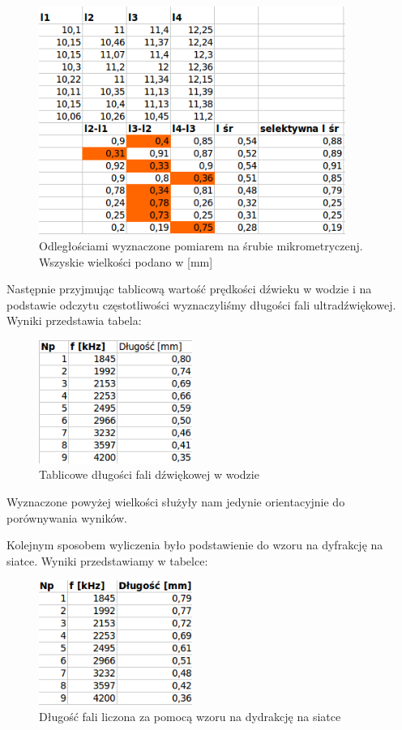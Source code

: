 \documentclass[a4paper,12pt]{article}
\begin{document}
\begin{figure} [H]
  \begin{center}
    \includegraphics[width = 10cm]{tab2.png}
    \caption{Odległościami wyznaczone pomiarem na śrubie mikrometryczenj. Wszyskie wielkości podano w [mm]}
  \end{center}
\end{figure}


Następnie przyjmując tablicową wartość prędkości dźwieku w wodzie i na podstawie odczytu częstotliwości wyznaczyliśmy długości fali ultradźwiękowej. Wyniki przedstawia tabela: 

\begin{figure} [H]
  \begin{center}
    \includegraphics[width = 5cm]{tab3.png}
    \caption{Tablicowe długości fali dźwiękowej w wodzie}
  \end{center}
\end{figure}

Wyznaczone powyżej wielkości służyły nam jedynie orientacyjnie do porównywania wyników. 

Kolejnym sposobem wyliczenia było podstawienie do wzoru na dyfrakcję na siatce. Wyniki przedstawiamy w tabelce: 

\begin{figure} [H]
  \begin{center}
    \includegraphics[width = 5cm]{tab4.png}
    \caption{Długość fali liczona za pomocą wzoru na dydrakcję na siatce}
  \end{center}
\end{figure}
\end{document}
